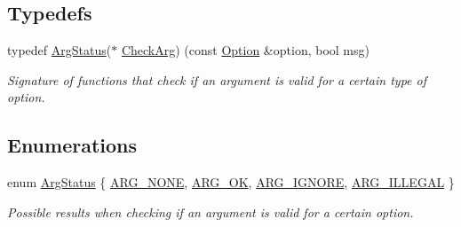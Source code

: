 \subsection*{Typedefs}
\begin{DoxyCompactItemize}
\item 
typedef \hyperlink{namespaceoption_aee8c76a07877335762631491e7a5a1a9}{Arg\+Status}($\ast$ \hyperlink{namespaceoption_a4cdf403efae65e18bf850e2001b12a2a}{Check\+Arg}) (const \hyperlink{classoption_1_1_option}{Option} \&option, bool msg)
\begin{DoxyCompactList}\small\item\em Signature of functions that check if an argument is valid for a certain type of option. \end{DoxyCompactList}\end{DoxyCompactItemize}
\subsection*{Enumerations}
\begin{DoxyCompactItemize}
\item 
enum \hyperlink{namespaceoption_aee8c76a07877335762631491e7a5a1a9}{Arg\+Status} \{ \hyperlink{namespaceoption_aee8c76a07877335762631491e7a5a1a9a353903b042e8eb0aa2f60c0043a58a7e}{A\+R\+G\+\_\+\+N\+O\+NE}, 
\hyperlink{namespaceoption_aee8c76a07877335762631491e7a5a1a9a445e08cb1747e5a22929e7ef2da43b55}{A\+R\+G\+\_\+\+OK}, 
\hyperlink{namespaceoption_aee8c76a07877335762631491e7a5a1a9a83e0837c79c957525918111d33cab3a9}{A\+R\+G\+\_\+\+I\+G\+N\+O\+RE}, 
\hyperlink{namespaceoption_aee8c76a07877335762631491e7a5a1a9a9528e32563b795bd2930b12d0a5e382d}{A\+R\+G\+\_\+\+I\+L\+L\+E\+G\+AL}
 \}\begin{DoxyCompactList}\small\item\em Possible results when checking if an argument is valid for a certain option. \end{DoxyCompactList}
\end{DoxyCompactItemize}
